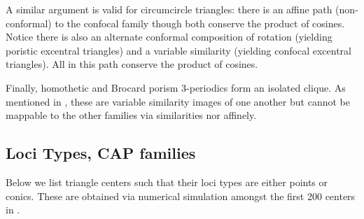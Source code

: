 A similar argument is valid for circumcircle triangles: there is an affine path (non-conformal) to the confocal family though both conserve the product of cosines. Notice there is also an alternate conformal composition of rotation (yielding poristic excentral triangles) and a variable similarity (yielding confocal excentral triangles). All in this path conserve the product of cosines.

Finally, homothetic and Brocard porism 3-periodics form an isolated clique. As mentioned in \cite{reznik2020-similarityII}, these are variable similarity images of one another but cannot be mappable to the other families via similarities nor affinely.

\subsection{Loci Types, CAP families}
\label{sec:06-loci-types}

Below we list triangle centers such that their loci types are either points or conics. These are obtained via numerical simulation amongst the first 200 centers in \cite{etc}.

